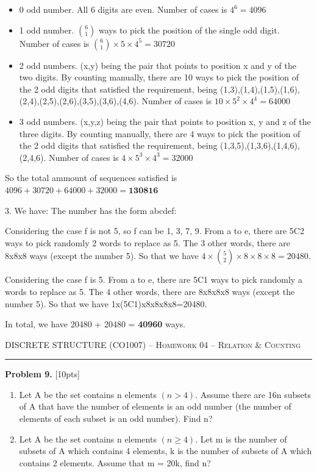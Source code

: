 \documentclass[12pt]{amsart}
\begin{document}
\begin{itemize}
    \item 0 odd number. All 6 digits are even. Number of cases is $4^6=4096$
    \item 1 odd number. $\binom{6}{1}$ ways to pick the position of the single odd digit. Number of cases is $\binom{6}{1}\times 5\times4^5=30720$
    \item 2 odd numbers. (x,y) being the pair that points to position x and y of the two digits. By counting manually, there are 10 ways to pick the position of the 2 odd digits that satisfied the requirement, being (1,3),(1,4),(1,5),(1,6),(2,4),(2,5),(2,6),(3,5),(3,6),(4,6). Number of cases is $10\times5^2\times4^4=64000$
    \item 3 odd numbers. (x,y,z) being the pair that points to position x, y  and z of the three digits. By counting manually, there are 4 ways to pick the position of the 2 odd digits that satisfied the requirement, being (1,3,5),(1,3,6),(1,4,6),(2,4,6). Number of cases is $4\times5^3\times4^3=32000$
\end{itemize}
So the total ammount of sequences satisfied is $4096+30720+64000+32000=\mathbf{130816}$

3. We have:
The number has the form abcdef:

Considering the case f is not 5, so f can be 1, 3, 7, 9.
From a to e, there are 5C2 ways to pick randomly 2 words to replace as 5.
The 3 other words, there are 8x8x8 ways (except the number 5).
So that we have $4\times\binom{5}{2}\times8\times8\times8=20480$.

Considering the case f is 5.
From a to e, there are 5C1 ways to pick randomly a words to replace as 5.
The 4 other words, there are 8x8x8x8 ways (except the number 5).
So that we have 1x(5C1)x8x8x8x8=20480.

In total, we have 20480 + 20480 = \textbf{40960} ways.

\newpage

{\scshape } \hfill {\scshape DISCRETE STRUCTURE (CO1007) -- Homework 04 -- Relation \& Counting} \hfill {\scshape }
 
\smallskip

\hrule

\bigskip

\bigskip 

\textbf{Problem 9. }[10pts] 
\begin{enumerate}
    \item Let A be the set contains n elements $(n > 4)$. Assume there are 16n subsets of A that have the number
of elements is an odd number (the number of elements of each subset is an odd number). Find n?
\item Let A be the set contains n elements $(n \geq 4)$. Let m is the number of subsets of A which contains 4
elements, k is the number of subsets of A which contains 2 elements. Assume that m = 20k, find n?
\end{enumerate}
\bigskip
\end{document}
